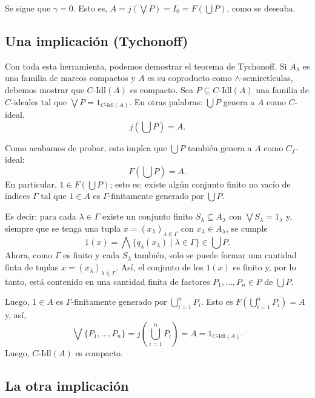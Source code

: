\documentclass[12pt,letterpaper,titlepage]{article}
\theoremstyle{definition}
\newcommand\Sup{\bigvee}
\renewcommand\inf{\wedge}
\newcommand\Inf{\bigwedge}
\newcommand\<{\langle}
\renewcommand\>{\rangle}
\newcommand\Idl{\text{-}\mathrm{Idl}}
\begin{document}
    Se sigue que $\gamma=0$.
    Esto es, $A=j(\Sup P) = I_0 = F(\bigcup P)$, como se deseaba.

\subsection{Una implicación (Tychonoff)}
    Con toda esta herramienta, podemos demostrar el teorema
    de Tychonoff.
    Si $A_\lambda$ es una familia de marcos compactos y $A$
    es su coproducto como $\inf$-semiretículas,
    debemos mostrar que $C\Idl(A)$ es compacto.
    Sea $P\subseteq C\Idl(A)$ una familia de $C$-ideales tal que
    $\Sup P = 1_{C\Idl(A)}$.
    En otras palabras: $\bigcup P$ genera a $A$ como $C$-ideal.
    \[
        j(\bigcup P) = A
    .\]
    
    Como acabamos de probar, esto implca que $\bigcup P$ también
    genera a $A$ como $C_f$-ideal:
    \[
        F(\bigcup P)=A
    .\]
    En particular, $1\in F(\bigcup P)$; esto es:
    existe algún conjunto finito no vacío de índices $\Gamma$
    tal que $1\in A$ es $\Gamma$-finitamente generado por
    $\bigcup P$.

    Es decir: para cada $\lambda\in\Gamma$ existe un conjunto
    finito $S_\lambda\subseteq A_\lambda$
    con $\Sup S_\lambda = 1_\lambda$
    y, siempre que se tenga una tupla
    $x=(x_\lambda)_{\lambda\in\Gamma}$
    con $x_\lambda\in A_\lambda$,
    se cumple
    \[
        1(x)
        =\Inf\{q_\lambda(x_\lambda)\mid\lambda\in\Gamma\}
        \in\bigcup P
    .\]
    Ahora, como $\Gamma$ es finito y cada $S_\lambda$
    también, solo se puede formar
    una cantidad finta de tuplas
    $x=(x_\lambda)_{\lambda\in\Gamma}$.
    Así, el conjunto de los $1(x)$ es finito y, por lo tanto,
    está contenido en una cantidad finita de factores
    $P_1,\dots,P_n\in P$ de $\bigcup P$.
    
    Luego, $1\in A$ es $\Gamma$-finitamente generado
    por $\bigcup_{i=1}^nP_i$.
    Esto es $F(\bigcup_{i=1}^n P_i)=A$ y, así,
    \[
        \Sup\{P_1,\dots,P_n\}
        = j(\bigcup_{i=1}^nP_i)
        = A
        = 1_{C\Idl(A)}
    .\]
    Luego, $C\Idl(A)$ es compacto.


\subsection{La otra implicación}
\end{document}
